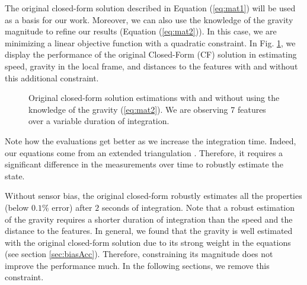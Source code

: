 \documentclass[letterpaper, 10 pt, journal, twoside]{IEEEtran}  %
\begin{document}
The original closed-form solution described in Equation (\ref{eq:mat1}) will be used as a basis for our work.
Moreover, we can also use the knowledge of the gravity magnitude to refine our results (Equation (\ref{eq:mat2})).
In this case, we are minimizing a linear objective function with a quadratic constraint.
In Fig. \ref{fig:original}, we display the performance of the original Closed-Form (CF) solution in estimating speed, gravity in the local frame, and distances to the features with and without this additional constraint.

\begin{figure}
  \centering
    \resizebox{0.7\columnwidth}{!}{}
    \caption{Original closed-form solution estimations with and without using the knowledge of the gravity (\ref{eq:mat2}). We are observing 7 features  over a variable duration of integration.\label{fig:original}}
\end{figure}

Note how the evaluations get better as we increase the integration time.
Indeed, our equations come from an extended triangulation \cite{Martinelli2012}.
Therefore, it requires a significant difference in the measurements over time to robustly estimate the state.


Without sensor bias, the original closed-form robustly estimates all the properties (below $0.1\%$ error) after $2$ seconds of integration.
Note that a robust estimation of the gravity requires a shorter duration of integration than the speed and the distance to the features.
In general, we found that the gravity is well estimated with the original closed-form solution due to its strong weight in the equations (see section \ref{sec:biasAcc}).
Therefore, constraining its magnitude does not improve the performance much.
In the following sections, we remove this constraint.
\end{document}
